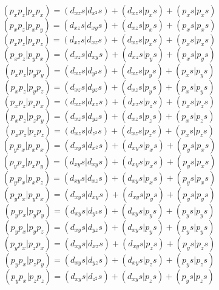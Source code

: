 \documentclass{article}
\begin{document}
\[  ( p_ { x } p_ { z } | p_ { x } p_ { x } ) = ( d_ { x z } s | d_ { x^2 } s ) + ( d_ { x z } s | p_ { x } s ) + ( p_ { x } s | p_ { x } s )  \]
\[  ( p_ { x } p_ { z } | p_ { x } p_ { y } ) = ( d_ { x z } s | d_ { x y } s ) + ( d_ { x z } s | p_ { x } s ) + ( p_ { x } s | p_ { x } s )  \]
\[  ( p_ { x } p_ { z } | p_ { x } p_ { z } ) = ( d_ { x z } s | d_ { x z } s ) + ( d_ { x z } s | p_ { x } s ) + ( p_ { x } s | p_ { x } s )  \]
\[  ( p_ { x } p_ { z } | p_ { y } p_ { x } ) = ( d_ { x z } s | d_ { x y } s ) + ( d_ { x z } s | p_ { y } s ) + ( p_ { x } s | p_ { y } s )  \]
\[  ( p_ { x } p_ { z } | p_ { y } p_ { y } ) = ( d_ { x z } s | d_ { y^2 } s ) + ( d_ { x z } s | p_ { y } s ) + ( p_ { x } s | p_ { y } s )  \]
\[  ( p_ { x } p_ { z } | p_ { y } p_ { z } ) = ( d_ { x z } s | d_ { y z } s ) + ( d_ { x z } s | p_ { y } s ) + ( p_ { x } s | p_ { y } s )  \]
\[  ( p_ { x } p_ { z } | p_ { z } p_ { x } ) = ( d_ { x z } s | d_ { x z } s ) + ( d_ { x z } s | p_ { z } s ) + ( p_ { x } s | p_ { z } s )  \]
\[  ( p_ { x } p_ { z } | p_ { z } p_ { y } ) = ( d_ { x z } s | d_ { y z } s ) + ( d_ { x z } s | p_ { z } s ) + ( p_ { x } s | p_ { z } s )  \]
\[  ( p_ { x } p_ { z } | p_ { z } p_ { z } ) = ( d_ { x z } s | d_ { z^2 } s ) + ( d_ { x z } s | p_ { z } s ) + ( p_ { x } s | p_ { z } s )  \]
\[  ( p_ { y } p_ { x } | p_ { x } p_ { x } ) = ( d_ { x y } s | d_ { x^2 } s ) + ( d_ { x y } s | p_ { x } s ) + ( p_ { y } s | p_ { x } s )  \]
\[  ( p_ { y } p_ { x } | p_ { x } p_ { y } ) = ( d_ { x y } s | d_ { x y } s ) + ( d_ { x y } s | p_ { x } s ) + ( p_ { y } s | p_ { x } s )  \]
\[  ( p_ { y } p_ { x } | p_ { x } p_ { z } ) = ( d_ { x y } s | d_ { x z } s ) + ( d_ { x y } s | p_ { x } s ) + ( p_ { y } s | p_ { x } s )  \]
\[  ( p_ { y } p_ { x } | p_ { y } p_ { x } ) = ( d_ { x y } s | d_ { x y } s ) + ( d_ { x y } s | p_ { y } s ) + ( p_ { y } s | p_ { y } s )  \]
\[  ( p_ { y } p_ { x } | p_ { y } p_ { y } ) = ( d_ { x y } s | d_ { y^2 } s ) + ( d_ { x y } s | p_ { y } s ) + ( p_ { y } s | p_ { y } s )  \]
\[  ( p_ { y } p_ { x } | p_ { y } p_ { z } ) = ( d_ { x y } s | d_ { y z } s ) + ( d_ { x y } s | p_ { y } s ) + ( p_ { y } s | p_ { y } s )  \]
\[  ( p_ { y } p_ { x } | p_ { z } p_ { x } ) = ( d_ { x y } s | d_ { x z } s ) + ( d_ { x y } s | p_ { z } s ) + ( p_ { y } s | p_ { z } s )  \]
\[  ( p_ { y } p_ { x } | p_ { z } p_ { y } ) = ( d_ { x y } s | d_ { y z } s ) + ( d_ { x y } s | p_ { z } s ) + ( p_ { y } s | p_ { z } s )  \]
\[  ( p_ { y } p_ { x } | p_ { z } p_ { z } ) = ( d_ { x y } s | d_ { z^2 } s ) + ( d_ { x y } s | p_ { z } s ) + ( p_ { y } s | p_ { z } s )  \]
\end{document}
